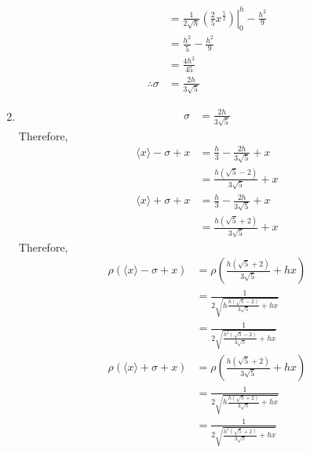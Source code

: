 \documentclass[fleqn, a4paper, 11pt, oneside]{amsart}
\theoremstyle{definition}
\theoremstyle{theorem}
\begin{document}
\begin{solution}
\begin{enumerate}[leftmargin=*]
\begin{align*}
                                                  & = \left. \frac{1}{2 \sqrt{h}} \left( \frac{2}{5} x^{\frac{5}{2}} \right) \right|_{0}^{h} - \frac{h^2}{9} \\
                                                  & = \frac{h^2}{5} - \frac{h^2}{9}                                                                          \\
                                                  & = \frac{4 h^2}{45}                                                                                       \\
				\therefore \sigma & = \frac{2 h}{3 \sqrt{5}}
			\end{align*}
		\item
			\begin{align*}
				\sigma & = \frac{2 h}{3 \sqrt{5}}
			\end{align*}
			Therefore,
			\begin{align*}
				\langle x \rangle - \sigma + x & = \frac{h}{3} - \frac{2 h}{3 \sqrt{5}} + x \\
                                                               & = \frac{h (\sqrt{5} - 2)}{3 \sqrt{5}} + x  \\
				\langle x \rangle + \sigma + x & = \frac{h}{3} - \frac{2 h}{3 \sqrt{5}} + x \\
                                                               & = \frac{h (\sqrt{5} + 2)}{3 \sqrt{5}} + x
			\end{align*}
			Therefore,
			\begin{align*}
				\rho\left( \langle x \rangle - \sigma + x \right) & = \rho\left( \frac{h (\sqrt{5} + 2)}{3 \sqrt{5}} + h x \right)   \\
                                                                                  & = \frac{1}{2 \sqrt{h \frac{h (\sqrt{5} - 2)}{3 \sqrt{5}} + h x}} \\
                                                                                  & = \frac{1}{2 \sqrt{\frac{h^2 (\sqrt{5} - 2)}{3 \sqrt{5}} + h x}} \\
				\rho\left( \langle x \rangle + \sigma + x \right) & = \rho\left( \frac{h (\sqrt{5} + 2)}{3 \sqrt{5}} + h x \right)   \\
                                                                                  & = \frac{1}{2 \sqrt{h \frac{h (\sqrt{5} + 2)}{3 \sqrt{5}} + h x}} \\
                                                                                  & = \frac{1}{2 \sqrt{\frac{h^2 (\sqrt{5} + 2)}{3 \sqrt{5}} + h x}} \\
			\end{align*}
	\end{enumerate}
\end{solution}
\end{document}
